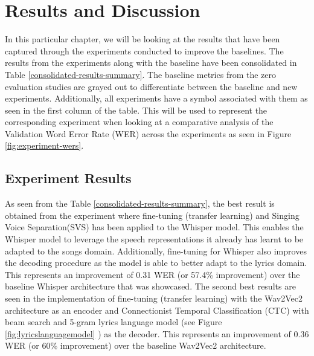 
\chapter{Results and Discussion}%
\label{sec:results}

In this particular chapter, we will be looking at the results that have been captured through the experiments conducted to improve the baselines. The results from the experiments along with the baseline have been consolidated in Table \ref{consolidated-results-summary}. The baseline metrics from the zero evaluation studies are grayed out to differentiate between the baseline and new experiments. Additionally, all experiments have a symbol associated with them as seen in the first column of the table. This will be used to represent the corresponding experiment when looking at a comparative analysis of the Validation Word Error Rate (WER) across the experiments as seen in Figure \ref{fig:experiment-wers}.

\section{Experiment Results}%
\label{sec:results}

As seen from the Table \ref{consolidated-results-summary}, the best result is obtained from the experiment where fine-tuning (transfer learning) and Singing Voice Separation(SVS) has been applied to the Whisper model. This enables the Whisper model to leverage the speech representations it already has learnt to be adapted to the songs domain. Additionally, fine-tuning for Whisper also improves the decoding procedure as the model is able to better adapt to the lyrics domain. This represents an improvement of 0.31 WER (or 57.4\% improvement) over the baseline Whisper architecture that was showcased. The second best results are seen in the implementation of fine-tuning (transfer learning) with the Wav2Vec2 architecture as an encoder and Connectionist Temporal Classification (CTC) with beam search and 5-gram lyrics language model (see Figure \ref{fig:lyricslanguagemodel} ) as the decoder. This represents an improvement of 0.36 WER (or 60\% improvement) over the baseline Wav2Vec2 architecture. 


